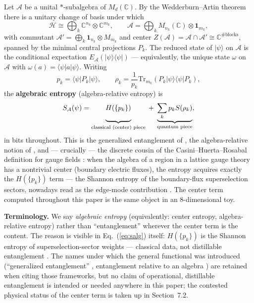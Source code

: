 \documentclass[11pt]{article}
\newcommand{\CC}{\mathbb{C}}
\newcommand{\Alg}{\mathcal{A}}
\newcommand{\EA}{E_{\mathcal{A}}}
\newcommand{\SA}{S_{\mathcal{A}}}
\begin{document}
Let $\Alg$ be a unital $*$-subalgebra of $M_d(\CC)$. By the Wedderburn--Artin theorem there is a unitary change of basis under which
\begin{equation*}
\mathcal{H} \cong \bigoplus_k \CC^{n_k} \otimes \CC^{m_k}, \qquad
\Alg = \bigoplus_k M_{n_k}(\CC) \otimes \mathbf{1}_{m_k},
\end{equation*}
with commutant $\Alg' = \bigoplus_k \mathbf{1}_{n_k} \otimes M_{m_k}$ and center $Z(\Alg) = \Alg \cap \Alg' \cong \CC^{\#\mathrm{blocks}}$, spanned by the minimal central projections $P_k$. The reduced state of $|\psi\rangle$ on $\Alg$ is the conditional expectation $\EA(|\psi\rangle\langle\psi|)$ --- equivalently, the unique state $\omega$ on $\Alg$ with $\omega(a) = \langle\psi|a|\psi\rangle$. Writing
\begin{equation*}
p_k = \langle\psi|P_k|\psi\rangle, \qquad
\rho_k = \frac{1}{p_k} \mathrm{Tr}_{m_k}\!\left(P_k |\psi\rangle\langle\psi| P_k\right),
\end{equation*}
the \textbf{algebraic entropy} (algebra-relative entropy) is
\begin{equation}
\SA(\psi) = \underbrace{H(\{p_k\})\vphantom{\sum_k}}_{\text{classical (center) piece}} \;+\; \underbrace{\sum_k p_k S(\rho_k)}_{\text{quantum piece}},
\label{eq:salg}
\end{equation}
in bits throughout. This is the generalized entanglement of \cite{barnum}, the algebra-relative notion of \cite{zanardi}, and --- crucially --- the discrete cousin of the Casini--Huerta--Rosabal definition for gauge fields \cite{chr}: when the algebra of a region in a lattice gauge theory has a nontrivial center (boundary electric fluxes), the entropy acquires exactly the $H(\{p_k\})$ term --- the Shannon entropy of the boundary-flux superselection sectors, nowadays read as the edge-mode contribution \cite{donnelly12, donnelly14}. The center term computed throughout this paper is the same object in an 8-dimensional toy.

\textbf{Terminology.} We say \emph{algebraic entropy} (equivalently: center entropy, algebra-relative entropy) rather than ``entanglement'' wherever the center term is the content. The reason is visible in Eq.~(\ref{eq:salg}) itself: $H(\{p_k\})$ is the Shannon entropy of superselection-sector weights --- classical data, not distillable entanglement \cite{donnelly14, chr, soni}. The names under which the general functional was introduced (``generalized entanglement'' \cite{barnum}, entanglement relative to an algebra \cite{zanardi}) are retained when citing those frameworks, but no claim of operational, distillable entanglement is intended or needed anywhere in this paper; the contested physical status of the center term is taken up in Section~7.2.
\end{document}
